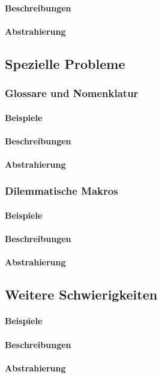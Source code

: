 \paragraph*{Beschreibungen}
\paragraph*{Abstrahierung}


\subsection{Spezielle Probleme}\label{problems:special}
\subsubsection{Glossare und Nomenklatur}\label{problems:glossaries}
\paragraph*{Beispiele}
\paragraph*{Beschreibungen}
\paragraph*{Abstrahierung}

\subsubsection{Dilemmatische Makros}\label{problems:macrodilemma}
\paragraph*{Beispiele}
\paragraph*{Beschreibungen}
\paragraph*{Abstrahierung}

\subsection{Weitere Schwierigkeiten}\label{problems:additional}
\paragraph*{Beispiele}
\paragraph*{Beschreibungen}
\paragraph*{Abstrahierung}
